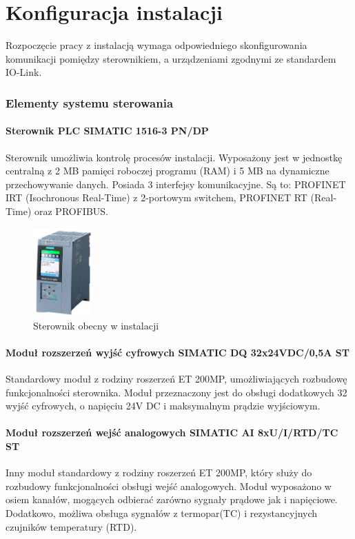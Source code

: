 \documentclass[a4paper,twoside,12pt]{book}
\begin{document}
\chapter{Konfiguracja instalacji}
\label{ch:05}
Rozpoczęcie pracy z instalacją wymaga odpowiedniego skonfigurowania komunikacji pomiędzy sterownikiem, a urządzeniami zgodnymi ze standardem IO-Link.

\subsection{Elementy systemu sterowania}
\subsubsection{Sterownik PLC SIMATIC 1516-3 PN/DP}
Sterownik umożliwia kontrolę procesów instalacji. Wyposażony jest w jednostkę centralną z 2 MB pamięci roboczej programu (RAM) i 5 MB na dynamiczne przechowywanie danych. Posiada 3 interfejsy komunikacyjne. Są to: PROFINET IRT (Isochronous Real-Time) z 2-portowym switchem, PROFINET RT (Real-Time) oraz PROFIBUS.

\begin{figure}[h]
	\centering
	\includegraphics[width=0.20\textwidth]{./img/sterownik.png}
	\caption{Sterownik obecny w instalacji \cite{siemens}}
	\label{fig:Sterownik}
\end{figure}

\subsubsection{Moduł rozszerzeń wyjść cyfrowych SIMATIC DQ 32x24VDC/0,5A ST}
Standardowy moduł z rodziny roszerzeń ET 200MP, umożliwiających rozbudowę funkcjonalności sterownika. Moduł przeznaczony jest do obsługi dodatkowych 32 wyjść cyfrowych, o napięciu 24V DC i maksymalnym prądzie wyjściowym.

\newpage
\subsubsection{Moduł rozszerzeń wejść analogowych SIMATIC AI 8xU/I/RTD/TC ST}
Inny moduł standardowy z rodziny roszerzeń ET 200MP, który służy do rozbudowy funkcjonalności obsługi wejść analogowych. Moduł wyposażono w osiem kanałów, mogących odbierać zarówno sygnały prądowe jak i napięciowe. Dodatkowo, możliwa obsługa sygnałów z termopar(TC) i rezystancyjnych czujników temperatury (RTD).
\end{document}
